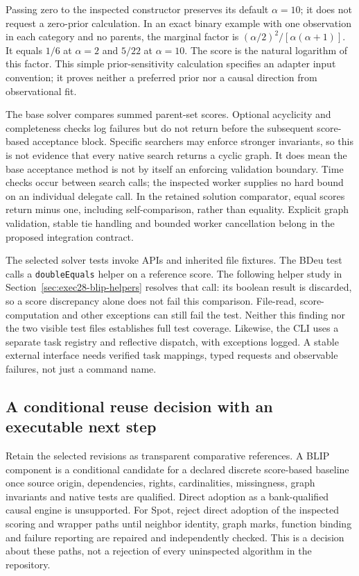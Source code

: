 Passing zero to the inspected constructor preserves its default $\alpha=10$;
it does not request a zero-prior calculation. In an exact binary example with
one observation in each category and no parents, the marginal factor is
$(\alpha/2)^2/[\alpha(\alpha+1)]$. It equals $1/6$ at $\alpha=2$ and $5/22$
at $\alpha=10$. The score is the natural logarithm of this factor. This simple
prior-sensitivity calculation specifies an adapter input convention; it proves
neither a preferred prior nor a causal direction from observational fit.
\citep{exec28_nested_reference}

The base solver compares summed parent-set scores. Optional acyclicity and
completeness checks log failures but do not return before the subsequent
score-based acceptance block. Specific searchers may enforce stronger
invariants, so this is not evidence that every native search returns a cyclic
graph. It does mean the base acceptance method is not by itself an enforcing
validation boundary. Time checks occur between search calls; the inspected
worker supplies no hard bound on an individual delegate call. In the retained
solution comparator, equal scores return minus one, including self-comparison,
rather than equality. Explicit graph validation, stable tie handling and
bounded worker cancellation belong in the proposed integration contract.
\citep{exec28_nested_sources,exec28_nested_reference}

The selected solver tests invoke APIs and inherited file fixtures. The BDeu
test calls a \texttt{doubleEquals} helper on a reference score. The following
helper study in Section~\ref{sec:exec28-blip-helpers} resolves that call: its
boolean result is discarded, so a score discrepancy alone does not fail this
comparison. File-read, score-computation and other exceptions can still fail
the test. Neither this finding nor the two visible test files establishes
full test coverage. Likewise, the CLI uses
a separate task registry and reflective dispatch, with exceptions logged. A
stable external interface needs verified task mappings, typed requests and
observable failures, not just a command name.~\citep{exec28_nested_sources}

\subsection{A conditional reuse decision with an executable next step}
Retain the selected revisions as transparent comparative references. A BLIP
component is a conditional candidate for a declared discrete score-based
baseline once source origin, dependencies, rights, cardinalities, missingness,
graph invariants and native tests are qualified. Direct adoption as a
bank-qualified causal engine is unsupported. For Spot, reject direct adoption
of the inspected scoring and wrapper paths until neighbor identity, graph
marks, function binding and failure reporting are repaired and independently
checked. This is a decision about these paths, not a rejection of every
uninspected algorithm in the repository.~\citep{exec28_nested_sources}

